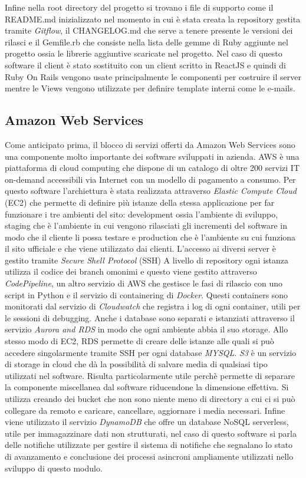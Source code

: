 \documentclass[target=bach,aauheader=,style=]{thud}
\begin{document}
Infine nella root directory del progetto si trovano i file di supporto come il README.md inizializzato nel momento in cui è stata creata la repository gestita tramite
\textit{Gitflow}\cite{gitflow}, il CHANGELOG.md che serve a tenere presente le versioni dei rilasci 
e il Gemfile.rb che consiste nella lista delle gemme di Ruby aggiunte nel progetto ossia le librerie aggiuntive scaricate nel progetto.
Nel caso di questo software il client è stato sostituito con un client scritto in ReactJS e quindi di Ruby On Rails vengono usate principalmente le componenti
per costruire il server mentre le Views vengono utilizzate per definire template interni come le e-mails.
\subsection{Amazon Web Services}
Come anticipato prima, il blocco di servizi offerti da Amazon Web Services sono una componente molto importante dei software sviluppati in azienda.
AWS è una piattaforma di cloud computing che dispone di un catalogo di oltre 200 servizi IT on-demand accessibili via Internet con un modello di pagamento a consumo. Per questo software l'archiettura 
è stata realizzata attraverso \textit{Elastic Compute Cloud} (EC2) che permette di definire più istanze della stessa applicazione per far funzionare i tre ambienti del sito:
development ossia l'ambiente di sviluppo, staging che è l'ambiente in cui vengono rilasciati gli incrementi del software in modo che il cliente li possa testare
e production che è l'ambiente su cui funziona il sito ufficiale e che viene utilizzato dai clienti. L'accesso ai diversi server è gestito tramite \textit{Secure Shell Protocol}\cite{rfc4251} (SSH)
A livello di repository ogni istanza utilizza il codice dei branch omonimi e questo viene gestito attraverso \textit{CodePipeline}, un altro servizio di AWS che gestisce le fasi
di rilascio con uno script in Python e il servizio di containering di \textit{Docker}\cite{docker}. Questi containers sono monitorati dal servizio di \textit{Cloudwatch} che %
registra i log di ogni container, utili per le sessioni di debugging. Anche i database sono separati e istanziati attraverso il servizio \textit{Aurora and RDS} in modo che ogni
ambiente abbia il suo storage. Allo stesso modo di EC2, RDS permette di creare delle istanze alle quali si può accedere singolarmente tramite SSH per ogni database \textit{MYSQL}\cite{mysql}.
\textit{S3} è un servizio di storage in cloud che dà la possibilità di salvare media di qualsiasi tipo utilizzati nel software. Risulta particolarmente utile perchè permette di separare
la componente miscellanea dal software riducendone la dimensione effettiva. Si utilizza creando dei bucket che non sono niente meno di directory a cui ci si può collegare
da remoto e caricare, cancellare, aggiornare i media necessari. Infine viene utilizzato il servizio \textit{DynamoDB} che offre un database NoSQL serverless,
utile per immagazzinare dati non strutturati, nel caso di questo software si parla delle notifiche utilizzate per gestire il sistema di notifiche che segnalano lo stato di
avanzamento e conclusione dei processi asincroni ampliamente utilizzati nello sviluppo di questo modulo.
\end{document}
